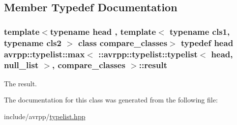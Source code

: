 \subsection{Member Typedef Documentation}
\hypertarget{classavrpp_1_1typelist_1_1max_3_01_1_1avrpp_1_1typelist_1_1typelist_3_01head_00_01null__list_01_4_00_01compare__classes_01_4_adac54fbc2af6f9342135124b2a5c3144}{
\subsubsection[{result}]{\setlength{\rightskip}{0pt plus 5cm}template$<$typename head , template$<$ typename cls1, typename cls2 $>$ class compare\_\-classes$>$ typedef head avrpp::typelist::max$<$ ::{\bf avrpp::typelist::typelist}$<$ head, {\bf null\_\-list} $>$, {\bf compare\_\-classes} $>$::{\bf result}}}
\label{classavrpp_1_1typelist_1_1max_3_01_1_1avrpp_1_1typelist_1_1typelist_3_01head_00_01null__list_01_4_00_01compare__classes_01_4_adac54fbc2af6f9342135124b2a5c3144}


The result. 



The documentation for this class was generated from the following file:\begin{DoxyCompactItemize}
\item 
include/avrpp/\hyperlink{typelist_8hpp}{typelist.hpp}\end{DoxyCompactItemize}
